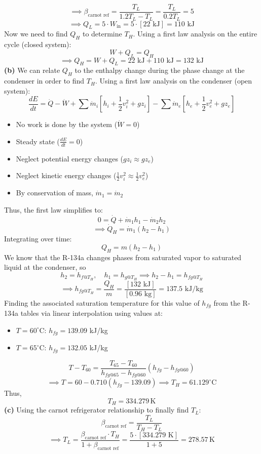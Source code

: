 \documentclass[12pt]{article}
\begin{document}
\[\implies \beta_\text{carnot ref} = \frac{T_L}{1.2T_L - T_L} = \frac{T_L}{0.2T_L} = 5\]
\[\implies {Q}_L = 5 \cdot {W}_\text{in} = 5 \cdot [22 \text{ kJ}] = 110 \text{ kJ}\]
Now we need to find $Q_H$ to determine $T_H$. Using a first law analysis on the entire cycle (closed system):
\[W + Q_L = Q_H\]
\[\implies Q_H = W + Q_L = 22 \text{ kJ} + 110 \text{ kJ} = 132 \text{ kJ}\]
\textbf{(b)} We can relate $Q_H$ to the enthalpy change during the phase change at the condenser in order to find $T_H$. Using a first law analysis on the condenser (open system):
\[\frac{dE}{dt} = \dot{Q} - \dot{W} + \sum\dot{m}_i \left[h_i+\frac{1}{2}v_i^2 + gz_i\right] - \sum\dot{m}_e \left[h_e+\frac{1}{2}v_e^2 + gz_e\right]\]
\begin{itemize}
\item No work is done by the system ($\dot{W}=0$)
\item Steady state ($\frac{dE}{dt}=0$)
\item Neglect potential energy changes ($g z_i \approx g z_e$)
\item Neglect kinetic energy changes ($\frac{1}{2}v_i^2 \approx \frac{1}{2}v_e^2$)
\item By conservation of mass, $\dot{m}_1 = \dot{m}_2$
\end{itemize}
Thus, the first law simplifies to:
\[0 = \dot{Q} + \dot{m}_1h_1 -\dot{m}_2h_2\]
\[\implies \dot{Q}_H = \dot{m}_1(h_2 - h_1)\]
Integrating over time:
\[Q_H = m(h_2 - h_1)\]
We know that the R-134a changes phases from saturated vapor to saturated liquid at the condenser, so
\[h_2 = h_{f @ T_H},\quad h_1 = h_{g@ T_H}\implies h_2-h_1 = h_{fg @ T_H}\]
\[\implies h_{fg @ T_H} =\frac{Q_H}{m} = \frac{[132 \text{ kJ}]}{[0.96 \text{ kg}]} = 137.5 \text{ kJ/kg}\]
Finding the associated saturation temperature for this value of $h_{fg}$ from the R-134a tables via linear interpolation using values at:
\begin{itemize}
\item $T=60^\circ$C: $h_{fg}=139.09$ kJ/kg
\item $T=65^\circ$C: $h_{fg}=132.05$ kJ/kg
\end{itemize}
\[T - T_{60} = \frac{T_{65} - T_{60}}{h_{fg@65} - h_{fg@60}} (h_{fg} - h_{fg@60})\]
\[\implies T = 60 -0.710 (h_{fg} - 139.09) \implies T_H = 61.129^\circ\text{C}\]
\newpage\noindent
Thus, 
\[T_H = 334.279\,\text{K}\]
\textbf{(c)} Using the carnot refrigerator relationship to finally find $T_L$:
\[\beta_\text{carnot ref}  = \frac{T_L}{T_H - T_L}\]
\[\implies T_L = \frac{\beta_\text{carnot ref} \cdot T_H}{1 + \beta_\text{carnot ref}} = \frac{5 \cdot [334.279\text{ K}]}{1 + 5} = 278.57\,\text{K}\]
\end{document}
